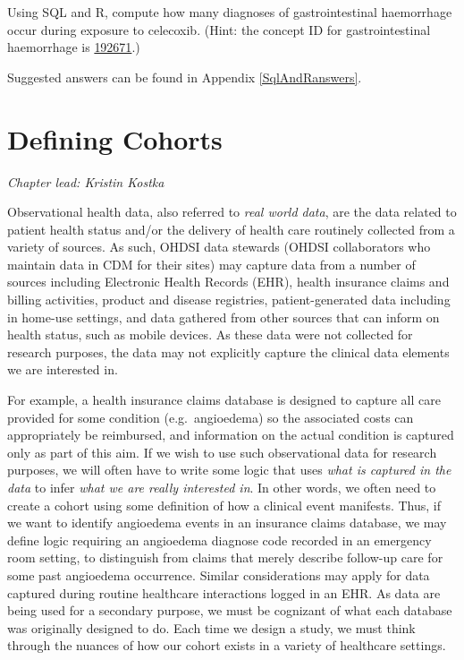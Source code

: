 \documentclass[11pt]{book}
\theoremstyle{definition}
\theoremstyle{definition}
\theoremstyle{definition}
\theoremstyle{remark}
\let\BeginKnitrBlock\begin \let\EndKnitrBlock\end
\begin{document}
\BeginKnitrBlock{exercise}
\protect\hypertarget{exr:exerciseGiBleedsDuringCelecoxib}{}{\label{exr:exerciseGiBleedsDuringCelecoxib} }Using SQL and R, compute how many diagnoses of gastrointestinal haemorrhage occur during exposure to celecoxib. (Hint: the concept ID for gastrointestinal haemorrhage is \href{http://athena.ohdsi.org/search-terms/terms/192671}{192671}.)
\EndKnitrBlock{exercise}

Suggested answers can be found in Appendix \ref{SqlAndRanswers}.

\hypertarget{Cohorts}{%
\chapter{Defining Cohorts}\label{Cohorts}}

\emph{Chapter lead: Kristin Kostka}

Observational health data, also referred to \emph{real world data}, are the data related to patient health status and/or the delivery of health care routinely collected from a variety of sources. As such, OHDSI data stewards (OHDSI collaborators who maintain data in CDM for their sites) may capture data from a number of sources including Electronic Health Records (EHR), health insurance claims and billing activities, product and disease registries, patient-generated data including in home-use settings, and data gathered from other sources that can inform on health status, such as mobile devices. As these data were not collected for research purposes, the data may not explicitly capture the clinical data elements we are interested in.

For example, a health insurance claims database is designed to capture all care provided for some condition (e.g.~angioedema) so the associated costs can appropriately be reimbursed, and information on the actual condition is captured only as part of this aim. If we wish to use such observational data for research purposes, we will often have to write some logic that uses \emph{what is captured in the data} to infer \emph{what we are really interested in}. In other words, we often need to create a cohort using some definition of how a clinical event manifests. Thus, if we want to identify angioedema events in an insurance claims database, we may define logic requiring an angioedema diagnose code recorded in an emergency room setting, to distinguish from claims that merely describe follow-up care for some past angioedema occurrence. Similar considerations may apply for data captured during routine healthcare interactions logged in an EHR. As data are being used for a secondary purpose, we must be cognizant of what each database was originally designed to do. Each time we design a study, we must think through the nuances of how our cohort exists in a variety of healthcare settings.
\end{document}

